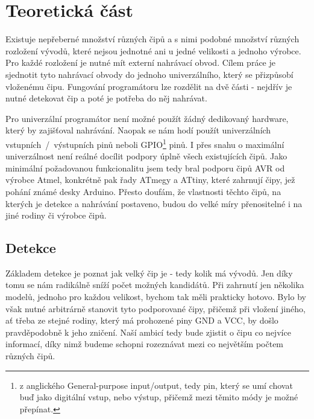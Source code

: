 \documentclass[11pt,a4paper,twoside,openright]{report}
\begin{document}


\setcounter{tocdepth}{2}
\tableofcontents

\chapter{Teoretická část}
\pagestyle{fancy}

Existuje nepřeberné množství různých čipů a s nimi podobné množství různých rozložení vývodů, které nejsou jednotné ani u jedné velikosti a jednoho výrobce. Pro každé rozložení je nutné mít externí nahrávací obvod. Cílem práce je sjednotit tyto nahrávací obvody do jednoho univerzálního, který se přizpůsobí vloženému čipu. Fungování programátoru lze rozdělit na dvě části - nejdřív je nutné detekovat čip a poté je potřeba do něj nahrávat. 

Pro univerzální programátor není možné použít žádný dedikovaný hardware, který by zajišťoval nahrávání. Naopak se nám hodí použít univerzálních vstupních~/~výstupních pinů neboli GPIO\footnote{z anglického General-purpose input/output, tedy pin, který se umí chovat buď jako digitální vstup, nebo výstup, přičemž mezi těmito módy je možné přepínat.} pinů. I přes snahu o maximální univerzálnost není reálné docílit podpory úplně všech existujících čipů. Jako minimální požadovanou funkcionalitu jsem tedy bral podporu čipů AVR od výrobce Atmel, konkrétně pak řady ATmegy a ATtiny, které zahrnují čipy, jež pohání známé desky Arduino. Přesto doufám, že vlastnosti těchto čipů, na kterých je detekce a nahrávání postaveno, budou do velké míry přenositelné i na jiné rodiny či výrobce čipů.

\section{Detekce}

Základem detekce je poznat jak velký čip je - tedy kolik má vývodů. Jen díky tomu se nám radikálně sníží počet možných kandidátů. Při zahrnutí jen několika modelů, jednoho pro každou velikost, bychom tak měli prakticky hotovo. Bylo by však nutné arbitrárně stanovit tyto podporované čipy, přičemž při vložení jiného, ať třeba ze stejné rodiny, který má prohozené piny GND a VCC, by došlo pravděpodobně k jeho zničení. Naší ambicí tedy bude zjistit o čipu co nejvíce informací, díky nimž budeme schopni rozeznávat mezi co největším počtem různých čipů.
\end{document}
